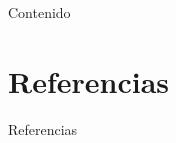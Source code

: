 \documentclass[11pt]{beamer}
\begin{document}
\renewcommand{\contentsname}{Contenido}
  
  \begin{frame}
    
  \end{frame}
	
	\begin{frame}{Contenido}
	  \tiny \tableofcontents
	\end{frame}
	
  
  
  \section{Referencias}
  \begin{frame}{Referencias}
	  
	\end{frame}
	
\end{document}
